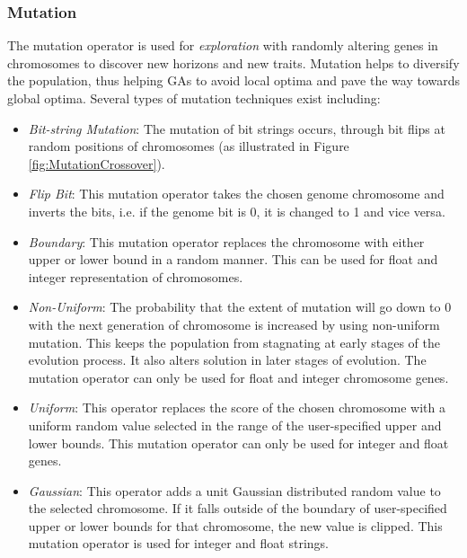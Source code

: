 \documentclass[journal]{IEEEtran}
\begin{document}
\vspace{2mm}
\subsubsection{Mutation}

The mutation operator is used for \textit{exploration} with randomly altering genes in chromosomes to discover new horizons and new traits. Mutation helps to diversify the population, thus helping GAs to avoid local optima and pave the way towards global optima. Several types of mutation techniques exist including:

\begin{itemize}

\item \emph{Bit-string Mutation}: The mutation of bit strings occurs, through bit flips at random positions of chromosomes (as illustrated in Figure \ref{fig:MutationCrossover}).

\item \emph{Flip Bit}: This mutation operator takes the chosen genome chromosome and inverts the bits, i.e. if the genome bit is 0, it is changed to 1 and vice versa.

\item \emph{Boundary}: This mutation operator replaces the chromosome with either upper or lower bound in a random manner. This can be used for float and integer representation of chromosomes.

\item \emph{Non-Uniform}: The probability that the extent of mutation will go down to 0 with the next generation of chromosome is increased by using non-uniform mutation. This keeps the population from stagnating at early stages of the evolution process. It also alters solution in later stages of evolution. The mutation operator can only be used for float and integer chromosome genes.

\item \emph{Uniform}: This operator replaces the score of the chosen chromosome with a uniform random value selected in the range of the user-specified upper and lower bounds. This mutation operator can only be used for integer and float genes.

\item \emph{Gaussian}: This operator adds a unit Gaussian distributed random value to the selected chromosome. If it falls outside of the boundary of user-specified upper or lower bounds for that chromosome, the new value is clipped. This mutation operator is used for integer and float strings.

\end{itemize}
\end{document}
